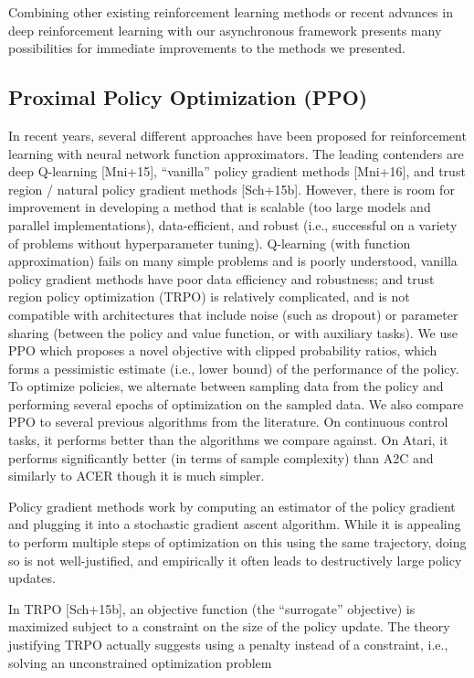 \documentclass[conference]{IEEEtran}
\begin{document}
Combining other existing reinforcement learning methods or recent advances in deep reinforcement learning
with our asynchronous framework presents many possibilities for immediate improvements to the methods we presented.

\subsection{\textbf{Proximal Policy Optimization (PPO)}}

In recent years, several different approaches have been proposed for reinforcement learning with neural network function approximators. The leading contenders are deep Q-learning [Mni+15], “vanilla” policy gradient methods [Mni+16], and trust region / natural policy gradient methods [Sch+15b]. However, there is room for improvement in developing a method that is scalable (too large models and parallel implementations), data-efficient, and robust (i.e., successful on a variety of problems without hyperparameter tuning). Q-learning (with function approximation) fails on many simple problems and is poorly understood, vanilla policy gradient methods have poor data efficiency and robustness; and trust region policy optimization (TRPO) is relatively complicated, and is not compatible with architectures that include noise (such as dropout) or parameter sharing (between the policy and value function, or with auxiliary tasks). We use PPO which proposes a novel objective with clipped probability ratios, which forms a pessimistic estimate (i.e., lower bound) of the performance of the policy. To optimize policies, we alternate between sampling data from the policy and performing several epochs of optimization on the sampled data. We also compare PPO to several previous algorithms from the literature. On continuous control tasks, it performs better than the algorithms we compare against. On Atari, it performs significantly better (in terms of sample complexity) than A2C and similarly to ACER though it is much simpler.

Policy gradient methods work by computing an estimator of the policy gradient and plugging it into a stochastic gradient ascent algorithm. While it is appealing to perform multiple steps of optimization on this using the same trajectory, doing so is not well-justified, and empirically it often leads to destructively large policy updates.

In TRPO [Sch+15b], an objective function (the “surrogate” objective) is maximized subject to a constraint on the size of the policy update. The theory justifying TRPO actually suggests using a penalty instead of a constraint, i.e., solving an unconstrained optimization problem
\end{document}
